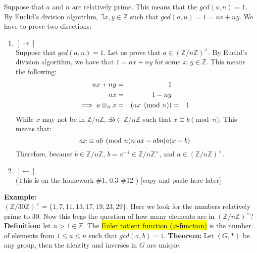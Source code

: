 \documentclass[12pt]{report}
\newcommand{\examples}[1]{{\leavevmode\color{Maroon} #1}}
\newcommand{\definitions}[1]{{\leavevmode\color{blue} #1}}
\newcommand{\proof}[1]{{\leavevmode\color{ForestGreen} #1}}
\begin{document}
	\proof{
		Suppose that $a$ and $n$ are relatively prime. This means that the $gcd(a,n)=1$. By  Euclid's division algorithm, $\exists x,y\in \mathbb{Z}$ such that $gcd(a,n)=1=ax+ny$. We have to prove two directions: 
		\begin{enumerate}
			\item $[\to]$\\
			Suppose that $gcd(a,n)=1$. Let us prove that $a\in (\mathbb{Z}/n\mathbb{Z})^\times$. By Euclid's division algorithm, we have that $1=ax+ny$ for some $x,y\in \mathbb{Z}$. This means the following: 
			\begin{equation*}
				\setcounter{equation}{1}
				\begin{aligned}
				ax+ny&=&1\\
				ax&=&1-ny\\
				\implies a\otimes_n x&=&(ax\pmod n)&=&1
				\end{aligned}
			\end{equation*}
			While $x$ may not be in $\mathbb{Z}/n\mathbb{Z}$, $\exists b\in\mathbb{Z}/n\mathbb{Z}$ such that $x\equiv b\pmod n$.  This means that: 
			\begin{equation*}
				ax\equiv ab\pmod n\\
				n|ax-ab\\
				n|a(x-b)
			\end{equation*}
			Therefore, because $b\in \mathbb{Z}/n\mathbb{Z}$,  $b=a^{-1}\in\mathbb{Z}/n\mathbb{Z}^\times$, and $a\in(\mathbb{Z}/n\mathbb{Z})^\times$. 
			\item $[\leftarrow]$ \\
			(This is on the homework \#1, 0.3 \#12 ) [copy and paste here later]
		\end{enumerate}
	}
	\examples{
		\textbf{Example: }\\ $(\mathbb{Z}/30\mathbb{Z})^\times=\{1,7,11,13,17,19,23,29\}$. Here we look for the numbers relatively prime to 30.
		\vskip 0.05in
		Now this begs the question of how many elements are in $(\mathbb{Z}/n\mathbb{Z})^\times$? 
	}
	\vskip 0.1in
	\definitions{
		\textbf{Definition: } let $n>1\in\mathbb{Z}$. The \hl{Euler totient function ($\varphi$-function)} is the number of elements from $1\leq a\leq n$ such that $gcd(a,b)=1$.
		\vskip 0.1in
		\textbf{Theorem: }Let $(G,*)$ be any group, then the identity and inverses in $G$ are unique. 
	}
	\vskip 0.05in
\end{document}
